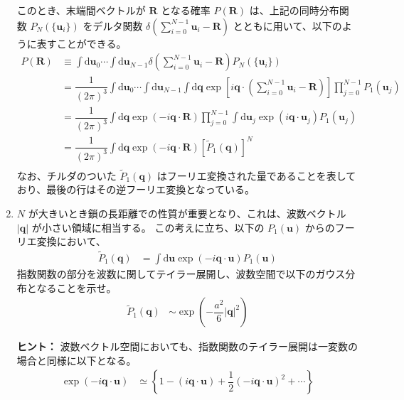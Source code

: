 \documentclass[uplatex,dvipdfmx,a4paper,11pt]{jsarticle}
\newcommand{\diff}{\mathrm d}
\begin{document}
\begin{enumerate}
このとき、末端間ベクトルが $\bm{R}$ となる確率 $P(\bm{R})$ は、上記の同時分布関数 $P_N(\{\bm{u}_i\}) $ をデルタ関数 $\delta \left( \sum_{i=0}^{N-1} \bm{u}_i - \bm{R} \right)$ とともに用いて、以下のように表すことができる。
\begin{align*}
P(\bm{R}) 
	&\equiv \int \diff \bm{u}_0 \cdots \int \diff \bm{u}_{N-1} \delta \left( \sum_{i=0}^{N-1} \bm{u}_i - \bm{R} \right) P_N(\{\bm{u}_i \}) \\
	&= \dfrac{1}{(2 \pi)^3} \int \diff \bm{u}_0 \cdots \int \diff \bm{u}_{N-1} \int \diff \bm{q} \exp \left[ i \bm{q} \cdot \left( \sum_{i=0}^{N-1} \bm{u}_i - \bm{R} \right) \right] \prod_{j=0}^{N-1} P_1 (\bm{u}_j) \\
	&= \dfrac{1}{(2 \pi)^3} \int \diff \bm{q} \exp \left( -i \bm{q} \cdot \bm{R} \right) \prod_{j=0}^{N-1} \int \diff \bm{u}_j \exp(i\bm{q} \cdot \bm{u}_j ) P_1 (\bm{u}_j) \\
	&= \dfrac{1}{(2 \pi)^3} \int \diff \bm{q} \exp \left( -i \bm{q} \cdot \bm{R} \right) \left[\tilde{P}_1 (\bm{q}) \right]^N \\
\end{align*}
なお、チルダのついた $\tilde{P}_1 (\bm{q})$ はフーリエ変換された量であることを表しており、最後の行はその逆フーリエ変換となっている。
\newpage


\item
$N$ が大きいとき鎖の長距離での性質が重要となり、これは、波数ベクトル $|\bm{q}|$ が小さい領域に相当する。
この考えに立ち、以下の $P_1 (\bm{u})$ からのフーリエ変換において、
\begin{align*}
\tilde{P}_1 (\bm{q}) 
	&= \int \diff \bm{u} \exp(- i\bm{q} \cdot \bm{u} ) P_1 (\bm{u})
\end{align*}
指数関数の部分を波数に関してテイラー展開し、波数空間で以下のガウス分布となることを示せ。
\begin{align*}
\tilde{P}_1 (\bm{q}) 
	&\sim \exp \left( - \dfrac{a^2}{6} |\bm{q}|^2 \right)
\end{align*}




\begin{itembox}[l]{{\bf ヒント：}}
波数ベクトル空間においても、指数関数のテイラー展開は一変数の場合と同様に以下となる。
\begin{align*}
\exp(- i\bm{q} \cdot \bm{u} )
	&\simeq \left \{ 1-( i \bm{q} \cdot \bm{u} ) +\dfrac{1}{2} (-i \bm{q} \cdot \bm{u})^2 + \cdots \right\} 
\end{align*}


\end{itembox}
\end{enumerate}
\end{document}

